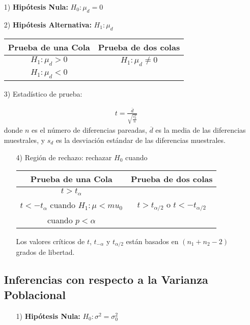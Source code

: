 \begin{itemize}
\item[1) ] \textbf{Hip\'otesis Nula:} $H_{0}:\mu_{d}=0$
\item[2) ] \textbf{Hip\'otesis Alternativa: } $H_{1}:\mu_{d}$

\begin{tabular}{cc}\hline
\textbf{Prueba de una Cola} & \textbf{Prueba de dos colas}\\\hline
$H_{1}:\mu_{d}>0$ & $H_{1}:\mu_{d}\neq 0$\\ 
$H_{1}:\mu_{d}<0$&\\
\end{tabular}

\item[3) ] Estad\'istico de prueba:

\begin{eqnarray*}
t=\frac{\overline{d}}{\sqrt{\frac{s_{d}^{2}}{n}}}
\end{eqnarray*}
donde $n$ es el n\'umero de diferencias pareadas, $\overline{d}$ es la media de las diferencias muestrales, y $s_{d}$ es la desviaci\'on est\'andar de las diferencias muestrales.

\begin{itemize}
\item[4) ] Regi\'on de rechazo: rechazar $H_{0}$ cuando

\begin{tabular}{cc}\hline
\textbf{Prueba de una Cola} & \textbf{Prueba de dos colas}\\\hline
$t>t_{\alpha}$ & \\
$t<-t_{\alpha}$ cuando $H_{1}:\mu<mu_{0}$&$t>t_{\alpha/2}$ o $t<-t_{\alpha/2}$\\
 cuando $p<\alpha$&\\
\end{tabular}

Los valores cr\'iticos de $t$, $t_{-\alpha}$ y $t_{\alpha/2}$ est\'an basados en $\left(n_{1}+n_{2}-2\right)$ grados de libertad.
\end{itemize}


\subsection*{Inferencias con respecto a la Varianza Poblacional}

\begin{itemize}
\item[1) ] \textbf{Hip\'otesis Nula:} $H_{0}:\sigma^{2}=\sigma^{2}_{0}$


\end{itemize}
\end{itemize}
